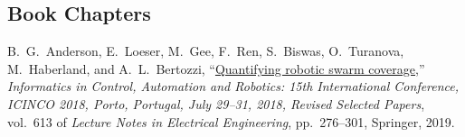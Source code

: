\vspace*{\baselineskip}

\subsection{Book Chapters}

\begin{enumerate}[label={[\arabic*]}]
	\item B.\ G.\ Anderson, E.\ Loeser, M.\ Gee, F.\ Ren, S.\ Biswas, O.\ Turanova, M.\ Haberland, and A.\ L.\ Bertozzi, ``\href{https://arxiv.org/pdf/1905.07655.pdf}{Quantifying robotic swarm coverage},'' \textit{Informatics in Control, Automation and Robotics: 15th International Conference, ICINCO 2018, Porto, Portugal, July 29--31, 2018, Revised Selected Papers}, vol.\ 613 of \textit{Lecture Notes in Electrical Engineering}, pp.\ 276--301, Springer, 2019.
\end{enumerate}
